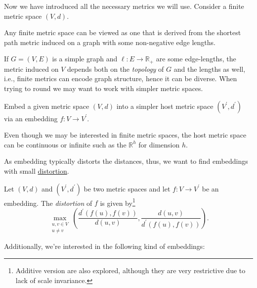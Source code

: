 Now we have introduced all the necessary metrics we will use. Consider a finite metric space \((V, d)\).

\begin{claim}
	Any finite metric space can be viewed as one that is derived from the shortest path metric induced on a graph with some non-negative edge lengths.
\end{claim}

If \(G = (V, E)\) is a simple graph and \(\ell \colon E \to \mathbb{R} _+\) are some edge-lengths, the metric induced on \(V\) depends both on the \emph{topology} of \(G\) and the lengths as well, i.e., finite metrics can encode graph structure, hence it can be diverse. When trying to round we may want to work with simpler metric spaces.

\begin{intuition}[Embedding]
	Embed a given metric space \((V, d)\) into a simpler host metric space \((V^{\prime} , d^{\prime} )\) via an embedding \(f \colon V \to V^{\prime} \).
\end{intuition}

\begin{note}
	Even though we may be interested in finite metric spaces, the host metric space can be continuous or infinite such as the \(\mathbb{R} ^h\) for dimension \(h\).
\end{note}

As embedding typically distorts the distances, thus, we want to find embeddings with small \hyperref[def:distortion]{distortion}.

\begin{definition}[Distortion]\label{def:distortion}
	Let \((V, d)\) and \((V^{\prime} , d^{\prime} )\) be two metric spaces and let \(f \colon V \to V^{\prime} \) be an embedding. The \emph{distortion} of \(f\) is given by\footnote{Additive version are also explored, although they are very restrictive due to lack of scale invariance.}
	\[
		\max _{\substack{u, v \in V \\ u \neq v}} \left( \frac{d^{\prime} (f(u), f(v))}{d(u, v)} , \frac{d(u, v)}{d^{\prime} (f(u), f(v))}\right) .
	\]
\end{definition}

Additionally, we're interested in the following kind of embeddings:

